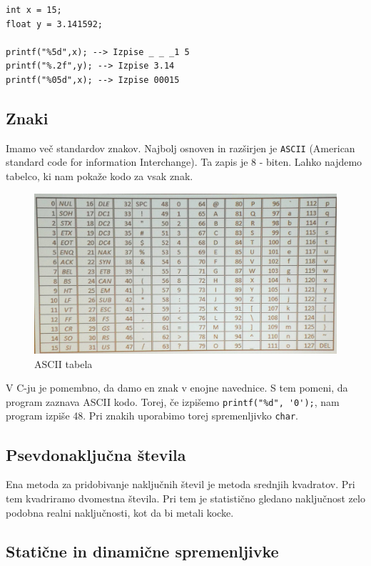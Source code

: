 \documentclass[a4paper, 12pt]{article}
\begin{document}
\begin{lstlisting}
int x = 15;
float y = 3.141592;

printf("%5d",x); --> Izpise _ _ _1 5
printf("%.2f",y); --> Izpise 3.14
printf("%05d",x); --> Izpise 00015
\end{lstlisting} 

\subsection{Znaki}

Imamo več standardov znakov. Najbolj osnoven in razširjen je \texttt{ASCII} (American standard code for information Interchange). Ta zapis je 8 - biten. Lahko najdemo tabelco, ki nam pokaže kodo za vsak znak.


\begin{figure}[h!]
	\centering
	\includegraphics[width=0.7\linewidth]{images/ascii.jpg}
	\caption{ASCII tabela}
	\label{fig:ascii-tabela }
\end{figure}

V C-ju je pomembno, da damo en znak v enojne navednice. S tem pomeni, da program zaznava ASCII kodo. Torej, če izpišemo \lstinline|printf("%d", '0');|, nam program izpiše 48. Pri znakih uporabimo torej spremenljivko \lstinline|char|.

\subsection{Psevdonaključna števila}

Ena metoda za pridobivanje naključnih števil je metoda srednjih kvadratov.
Pri tem kvadriramo dvomestna števila. Pri tem je statistično gledano naključnost zelo podobna realni naključnosti, kot da bi metali kocke.

\subsection{Statične in dinamične spremenljivke}
\end{document}
